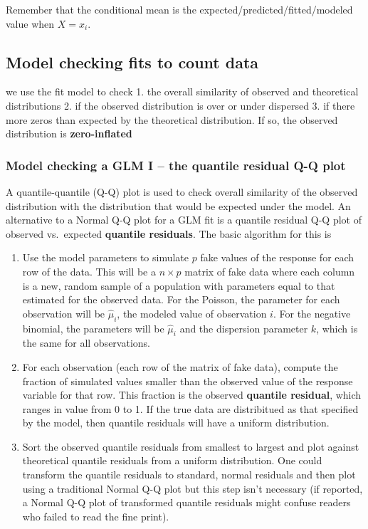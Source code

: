 \documentclass[]{book}
\providecommand{\tightlist}{%
  \setlength{\itemsep}{0pt}\setlength{\parskip}{0pt}}
\begin{document}
Remember that the conditional mean is the expected/predicted/fitted/modeled value when \(X=x_i\).

\hypertarget{model-checking-fits-to-count-data}{%
\subsection{Model checking fits to count data}\label{model-checking-fits-to-count-data}}

we use the fit model to check
1. the overall similarity of observed and theoretical distributions
2. if the observed distribution is over or under dispersed
3. if there more zeros than expected by the theoretical distribution. If so, the observed distribution is \textbf{zero-inflated}

\hypertarget{model-checking-a-glm-i-the-quantile-residual-q-q-plot}{%
\subsubsection{Model checking a GLM I -- the quantile residual Q-Q plot}\label{model-checking-a-glm-i-the-quantile-residual-q-q-plot}}

A quantile-quantile (Q-Q) plot is used to check overall similarity of the observed distribution with the distribution that would be expected under the model. An alternative to a Normal Q-Q plot for a GLM fit is a quantile residual Q-Q plot of observed vs.~expected \textbf{quantile residuals}. The basic algorithm for this is

\begin{enumerate}
\def\labelenumi{\arabic{enumi}.}
\tightlist
\item
  Use the model parameters to simulate \(p\) fake values of the response for each row of the data. This will be a \(n \times p\) matrix of fake data where each column is a new, random sample of a population with parameters equal to that estimated for the observed data. For the Poisson, the parameter for each observation will be \(\hat{\mu}_i\), the modeled value of observation \(i\). For the negative binomial, the parameters will be \(\hat{\mu}_i\) and the dispersion parameter \(k\), which is the same for all observations.
\item
  For each observation (each row of the matrix of fake data), compute the fraction of simulated values smaller than the observed value of the response variable for that row. This fraction is the observed \textbf{quantile residual}, which ranges in value from 0 to 1. If the true data are distribitued as that specified by the model, then quantile residuals will have a uniform distribution.
\item
  Sort the observed quantile residuals from smallest to largest and plot against theoretical quantile residuals from a uniform distribution. One could transform the quantile residuals to standard, normal residuals and then plot using a traditional Normal Q-Q plot but this step isn't necessary (if reported, a Normal Q-Q plot of transformed quantile residuals might confuse readers who failed to read the fine print).
\end{enumerate}
\end{document}
